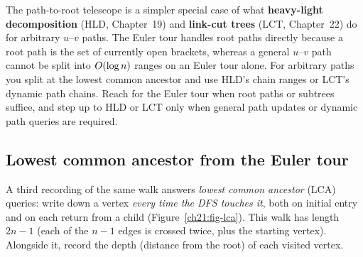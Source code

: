 \begin{connectionbox}
The path-to-root telescope is a simpler special case of what \textbf{heavy-light decomposition} (HLD, Chapter~19)
and \textbf{link-cut trees} (LCT, Chapter~22) do for arbitrary $u$--$v$ paths. The Euler tour handles
root paths directly because a root path is the set of currently open
brackets, whereas a general $u$--$v$ path cannot be split into $O(\log n)$ ranges on an Euler tour alone.
For arbitrary paths you split at the lowest common ancestor and use HLD's chain ranges
or LCT's dynamic path chains. Reach for the Euler tour when root paths or subtrees suffice,
and step up to HLD or LCT only when general path updates or dynamic path queries are required.
\end{connectionbox}

\subsection{Lowest common ancestor from the Euler tour}
\label{ch21:lca}

A third recording of the same walk answers \emph{lowest common ancestor} (LCA) queries: write down a
vertex \emph{every time the DFS touches it}, both on initial entry and on each return from a child (Figure~\ref{ch21:fig-lca}). This
walk has length $2n-1$ (each of the $n-1$ edges is crossed twice, plus the starting
vertex). Alongside it, record the depth (distance from the root) of each visited vertex.

